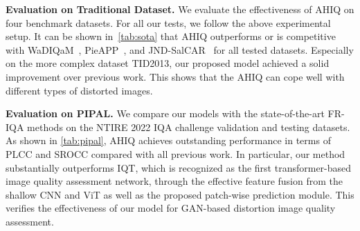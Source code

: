 \documentclass[10pt,twocolumn,letterpaper]{article}
\begin{document}
\vspace{2pt}
\noindent\textbf{Evaluation on Traditional Dataset.} We evaluate the effectiveness of AHIQ on four benchmark datasets. For all our tests, we follow the above experimental setup. It can be shown in~\cref{tab:sota} that AHIQ outperforms or is competitive with WaDIQaM~\cite{bosse2017deep}, PieAPP~\cite{prashnani2018pieapp}, and JND-SalCAR~\cite{seo2020novel} for all tested datasets. Especially on the more complex dataset TID2013, our proposed model achieved a solid improvement over previous work. This shows that the AHIQ can cope well with different types of distorted images.
\begin{table}[th]
\centering
\caption{Performance comparison after training on the entire KADID dataset~\cite{lin2019kadid}, then test on LIVE, CSIQ, and TID2013 Databases. Part of the performance scores of other methods are borrowed from~\cite{ding2020image}. The best scores are~\textbf{bolded} and missing scores are shown as ``–'' dash.}
\label{tab:kadid}
\end{table}

\vspace{2pt}
\noindent\textbf{Evaluation on PIPAL.} We compare our models with the state-of-the-art FR-IQA methods on the NTIRE 2022 IQA challenge validation and testing datasets. As shown in \cref{tab:pipal}, AHIQ achieves outstanding performance in terms of PLCC and SROCC compared with all previous work. In particular, our method substantially outperforms IQT, which is recognized as the first transformer-based image quality assessment network, through the effective feature fusion from the shallow CNN and ViT as well as the proposed patch-wise prediction module. This verifies the effectiveness of our model for GAN-based distortion image quality assessment.
\end{document}
